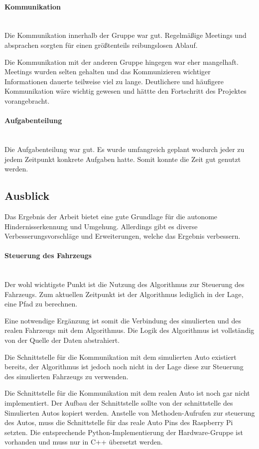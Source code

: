 \paragraph{Kommunikation} \mbox{}\\
Die Kommunikation innerhalb der Gruppe war gut.
Regelmäßige Meetings und absprachen sorgten für einen größtenteils reibungslosen Ablauf.

Die Kommunikation mit der anderen Gruppe hingegen war eher mangelhaft.
Meetings wurden selten gehalten und das Kommunizieren wichtiger Informationen dauerte teilweise viel zu lange.
Deutlichere und häufigere Kommunikation wäre wichtig gewesen und hättte den Fortschritt des Projektes vorangebracht.

\paragraph{Aufgabenteilung} \mbox{}\\
Die Aufgabenteilung war gut.
Es wurde umfangreich geplant wodurch jeder zu jedem Zeitpunkt konkrete Aufgaben hatte.
Somit konnte die Zeit gut genutzt werden.

\subsection{Ausblick}
Das Ergebnis der Arbeit bietet eine gute Grundlage für die autonome Hindernisserkennung und Umgehung.
Allerdings gibt es diverse Verbesserungsvorschläge und Erweiterungen, welche das Ergebnis verbessern.

\paragraph{Steuerung des Fahrzeugs} \mbox{}\\
Der wohl wichtigste Punkt ist die Nutzung des Algorithmus zur Steuerung des Fahrzeugs.
Zum aktuellen Zeitpunkt ist der Algorithmus lediglich in der Lage, eine Pfad zu berechnen.

Eine notwendige Ergänzung ist somit die Verbindung des simulierten und des realen Fahrzeugs mit dem Algorithmus.
Die Logik des Algorithmus ist vollständig von der Quelle der Daten abstrahiert.

Die Schnittstelle für die Kommunikation mit dem simulierten Auto existiert bereits,
der Algorithmus ist jedoch noch nicht in der Lage diese zur Steuerung des simulierten Fahrzeugs zu verwenden.

Die Schnittstelle für die Kommunikation mit dem realen Auto ist noch gar nicht implementiert.
Der Aufbau der Schnittstelle sollte von der schnittstelle des Simulierten Autos kopiert werden.
Anstelle von Methoden-Aufrufen zur steuerung des Autos, muss die Schnittstelle für das reale Auto Pins des Raspberry Pi setzten.
Die entsprechende Python-Implementierung der Hardware-Gruppe ist vorhanden und muss nur in C++ übersetzt werden.


